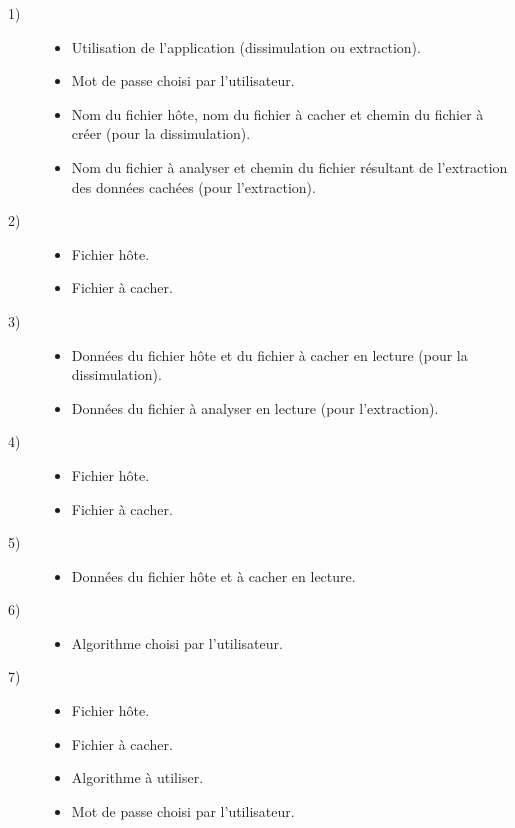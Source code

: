 \documentclass[11pt]{article}
\begin{document}
\begin{multicols}{2}
\begin{description}
\item[1)] %
\begin{itemize}
\item Utilisation de l'application (dissimulation ou extraction).
\item Mot de passe choisi par l'utilisateur. 
\item Nom du fichier hôte, nom du fichier à cacher et chemin du fichier à créer
    (pour la dissimulation).
\item Nom du fichier à analyser et chemin du fichier résultant de l'extraction
    des données cachées (pour l'extraction).
\end{itemize}
\item[2)] %
\begin{itemize}
\item Fichier hôte.
\item Fichier à cacher. 
\end{itemize}
\item[3)] %
\begin{itemize}
\item Données du fichier hôte et du fichier à cacher en lecture (pour la 
dissimulation).
\item Données du fichier à analyser en lecture (pour l'extraction).  
\end{itemize}
\item[4)] %
\begin{itemize}
\item Fichier hôte. 
\item Fichier à cacher. 
\end{itemize}
\item[5)] %
\begin{itemize}
\item Données du fichier hôte et à cacher en lecture. 
\end{itemize}
\item[6)] %
\begin{itemize}
\item Algorithme choisi par l'utilisateur.
\end{itemize}
\item[7)] %
\begin{itemize}
\item Fichier hôte. 
\item Fichier à cacher. 
\item Algorithme à utiliser. 
\item Mot de passe choisi par l'utilisateur. 

\end{itemize}
\end{description}
\end{multicols}
\end{document}
